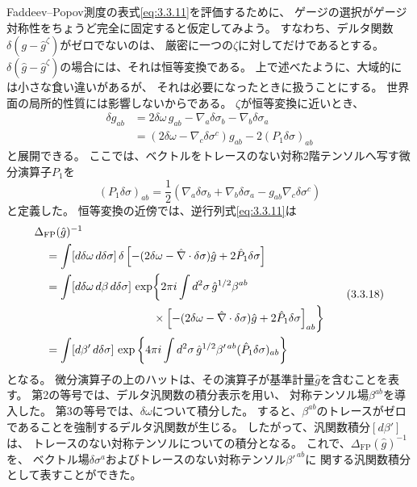 Faddeev--Popov測度の表式\eqref{eq:3.3.11}を評価するために、
ゲージの選択がゲージ対称性をちょうど完全に固定すると仮定してみよう。
すなわち、デルタ関数$\delta(g-\hat g^\zeta)$がゼロでないのは、
厳密に一つの$\zeta$に対してだけであるとする。
$\delta(\hat g-\hat g^\zeta)$の場合には、それは恒等変換である。
上で述べたように、大域的には小さな食い違いがあるが、
それは必要になったときに扱うことにする。
世界面の局所的性質には影響しないからである。
$\zeta$が恒等変換に近いとき、
\begin{equation}
\begin{aligned}
\delta g_{ab}
&=2\delta\omega\,g_{ab}-\nabla_a\delta\sigma_b-\nabla_b\delta\sigma_a\\
&=(2\delta\omega-\nabla_c\delta\sigma^c)g_{ab}
   -2(P_1\delta\sigma)_{ab}
\end{aligned}
\tag{3.3.16}\label{eq:3.3.16}
\end{equation}
と展開できる。
ここでは、ベクトルをトレースのない対称2階テンソルへ写す微分演算子$P_1$を
\begin{equation}
(P_1\delta\sigma)_{ab}
=\frac12\left(\nabla_a\delta\sigma_b+\nabla_b\delta\sigma_a
             -g_{ab}\nabla_c\delta\sigma^c\right)
\tag{3.3.17}\label{eq:3.3.17}
\end{equation}
と定義した。
恒等変換の近傍では、逆行列式\eqref{eq:3.3.11}は
\begin{equation}
\begin{aligned}
&\Delta_{\mathrm{FP}}(\hat g)^{-1}\\
&\quad=\int[d\delta\omega\,d\delta\sigma]\,
 \delta\left[-(2\delta\omega-\hat\nabla\cdot\delta\sigma)\hat g
                    +2\hat P_1\delta\sigma\right]\\
&\quad=\int[d\delta\omega\,d\beta\,d\delta\sigma]\,
 \exp\biggl\{2\pi i\int d^2\sigma\,\hat g^{1/2}\beta^{ab}\\
&\hspace{37mm}\times
 \left[-(2\delta\omega-\hat\nabla\cdot\delta\sigma)\hat g
                    +2\hat P_1\delta\sigma\right]_{ab}\biggr\}\\
&\quad=\int[d\beta'\,d\delta\sigma]\,
 \exp\left\{4\pi i\int d^2\sigma\,\hat g^{1/2}
                 \beta'^{\,ab}(\hat P_1\delta\sigma)_{ab}\right\}
\end{aligned}
\tag{3.3.18}\label{eq:3.3.18}
\end{equation}
となる。
微分演算子の上のハットは、その演算子が基準計量$\hat g$を含むことを表す。
第2の等号では、デルタ汎関数の積分表示を用い、
対称テンソル場$\beta^{ab}$を導入した。
第3の等号では、$\delta\omega$について積分した。
すると、$\beta^{ab}$のトレースがゼロであることを強制するデルタ汎関数が生じる。
したがって、汎関数積分$[d\beta']$は、
トレースのない対称テンソルについての積分となる。
これで、$\Delta_{\mathrm{FP}}(\hat g)^{-1}$を、
ベクトル場$\delta\sigma^a$およびトレースのない対称テンソル$\beta'^{\,ab}$に
関する汎関数積分として表すことができた。

